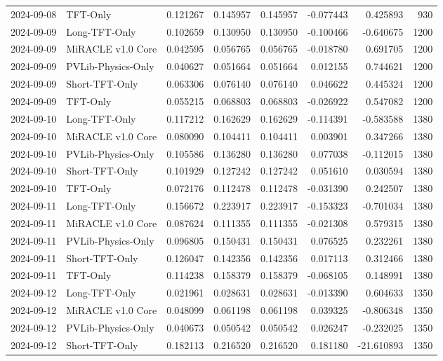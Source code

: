 \begin{tabular}{llrrrrrr}
2024-09-08 & TFT-Only & 0.121267 & 0.145957 & 0.145957 & -0.077443 & 0.425893 & 930 \\
2024-09-09 & Long-TFT-Only & 0.102659 & 0.130950 & 0.130950 & -0.100466 & -0.640675 & 1200 \\
2024-09-09 & MiRACLE v1.0 Core & 0.042595 & 0.056765 & 0.056765 & -0.018780 & 0.691705 & 1200 \\
2024-09-09 & PVLib-Physics-Only & 0.040627 & 0.051664 & 0.051664 & 0.012155 & 0.744621 & 1200 \\
2024-09-09 & Short-TFT-Only & 0.063306 & 0.076140 & 0.076140 & 0.046622 & 0.445324 & 1200 \\
2024-09-09 & TFT-Only & 0.055215 & 0.068803 & 0.068803 & -0.026922 & 0.547082 & 1200 \\
2024-09-10 & Long-TFT-Only & 0.117212 & 0.162629 & 0.162629 & -0.114391 & -0.583588 & 1380 \\
2024-09-10 & MiRACLE v1.0 Core & 0.080090 & 0.104411 & 0.104411 & 0.003901 & 0.347266 & 1380 \\
2024-09-10 & PVLib-Physics-Only & 0.105586 & 0.136280 & 0.136280 & 0.077038 & -0.112015 & 1380 \\
2024-09-10 & Short-TFT-Only & 0.101929 & 0.127242 & 0.127242 & 0.051610 & 0.030594 & 1380 \\
2024-09-10 & TFT-Only & 0.072176 & 0.112478 & 0.112478 & -0.031390 & 0.242507 & 1380 \\
2024-09-11 & Long-TFT-Only & 0.156672 & 0.223917 & 0.223917 & -0.153323 & -0.701034 & 1380 \\
2024-09-11 & MiRACLE v1.0 Core & 0.087624 & 0.111355 & 0.111355 & -0.021308 & 0.579315 & 1380 \\
2024-09-11 & PVLib-Physics-Only & 0.096805 & 0.150431 & 0.150431 & 0.076525 & 0.232261 & 1380 \\
2024-09-11 & Short-TFT-Only & 0.126047 & 0.142356 & 0.142356 & 0.017113 & 0.312466 & 1380 \\
2024-09-11 & TFT-Only & 0.114238 & 0.158379 & 0.158379 & -0.068105 & 0.148991 & 1380 \\
2024-09-12 & Long-TFT-Only & 0.021961 & 0.028631 & 0.028631 & -0.013390 & 0.604633 & 1350 \\
2024-09-12 & MiRACLE v1.0 Core & 0.048099 & 0.061198 & 0.061198 & 0.039325 & -0.806348 & 1350 \\
2024-09-12 & PVLib-Physics-Only & 0.040673 & 0.050542 & 0.050542 & 0.026247 & -0.232025 & 1350 \\
2024-09-12 & Short-TFT-Only & 0.182113 & 0.216520 & 0.216520 & 0.181180 & -21.610893 & 1350 \\

\end{tabular}
